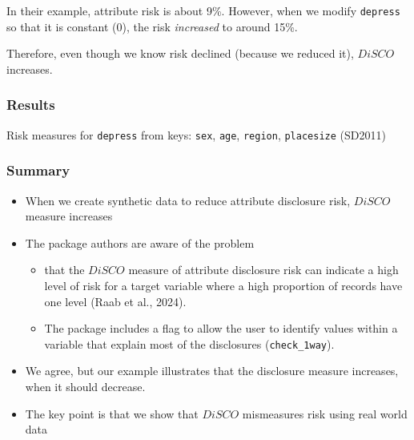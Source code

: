 \documentclass[t,8pt,utfx8]{beamer}
\begin{document}
\begin{spacing}{1.25}
{In their example, attribute risk is about 9\%. However, when we modify \texttt{depress} so that it is constant (0), the risk \emph{increased} to around 15\%.

Therefore, even though we know risk declined (because we reduced it), $DiSCO$ increases.

}

\begin{frame}[t]\frametitle{Results}

\begin{table}[!h]
    \centering
    \caption{Risk measures for \texttt{depress} from keys: \texttt{sex}, \texttt{age}, \texttt{region}, \texttt{placesize} (SD2011)}
    
    \label{tab:attribute_risk_sd2011}
\end{table}



\end{frame}

\begin{frame}[t]\frametitle{Summary}

\begin{itemize}
    \item When we create synthetic data to reduce attribute disclosure risk, $DiSCO$ measure increases

    \item The package authors are aware of the problem 
    \begin{itemize}
        \item  that the $DiSCO$ measure of attribute disclosure risk can indicate a high level of risk for a target variable where a high proportion of records have one level (Raab et al., 2024).
        \item The package includes a flag to allow the user to identify values within a variable that explain most of the disclosures (\texttt{check\_1way}).
    \end{itemize}
    \item We agree, but our example illustrates that the disclosure measure increases, when it should decrease.
    \item The key point is that we show that $DiSCO$ mismeasures risk using real world data
\end{itemize}

\end{frame}



\end{spacing}
\end{document}
